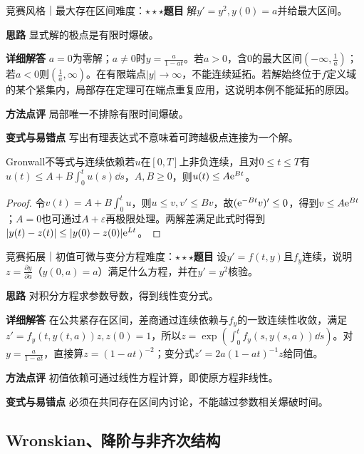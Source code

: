 \begin{example}{竞赛风格｜最大存在区间}{难度：$\star\star\star$}\label{deep:ex:ode_source_deep:blowup}\textbf{题目} 解$y'=y^2,y(0)=a$并给最大区间。\par\textbf{思路} 显式解的极点是有限时爆破。\par\textbf{详细解答} $a=0$为零解；$a\ne0$时$y=\frac{a}{1-at}$。若$a>0$，含0的最大区间$(-\infty,\frac{1}{a})$；若$a<0$则$(\frac{1}{a},\infty)$。在有限端点$|y|\to\infty$，不能连续延拓。若解始终位于$f$定义域的某个紧集内，局部存在定理可在端点重复应用，这说明本例不能延拓的原因。\par\textbf{方法点评} 局部唯一不排除有限时间爆破。\par\textbf{变式与易错点} 写出有理表达式不意味着可跨越极点连接为一个解。\end{example}

\begin{theorem}{Gronwall不等式与连续依赖}若$u$在$[0,T]$上非负连续，且对$0\le t\le T$有$u(t)\le A+B\int_0^tu(s)\dd s$，$A,B\ge0$，则$u(t)\le A\mathrm{e}^{Bt}$。\end{theorem}\begin{proof}令$v(t)=A+B\int_0^tu$，则$u\le v,v'\le Bv$，故$(\mathrm{e}^{-Bt}v)'\le0$，得到$v\le A\mathrm{e}^{Bt}$；$A=0$也可通过$A+\varepsilon$再极限处理。两解差满足此式时得到$|y(t)-z(t)|\le|y(0)-z(0)|\mathrm{e}^{Lt}$。\end{proof}

\begin{example}{竞赛拓展｜初值可微与变分方程}{难度：$\star\star\star$}\label{deep:ex:ode_source_deep:sensitivity}\textbf{题目} 设$y'=f(t,y)$且$f_y$连续，说明$z=\frac{\partial y}{\partial a}$（$y(0,a)=a$）满足什么方程，并在$y'=y^2$核验。\par\textbf{思路} 对积分方程求参数导数，得到线性变分式。\par\textbf{详细解答} 在公共紧存在区间，差商通过连续依赖与$f_y$的一致连续性收敛，满足$z'=f_y(t,y(t,a))z,z(0)=1$，所以$z=\exp(\int_0^tf_y(s,y(s,a))\dd s)$。对$y=\frac{a}{1-at}$，直接算$z=(1-at)^{-2}$；变分式$z'=2a(1-at)^{-1}z$给同值。\par\textbf{方法点评} 初值依赖可通过线性方程计算，即使原方程非线性。\par\textbf{变式与易错点} 必须在共同存在区间内讨论，不能越过参数相关爆破时间。\end{example}

\subsection{Wronskian、降阶与非齐次结构}\label{deep:ode_source_deep:linear}

